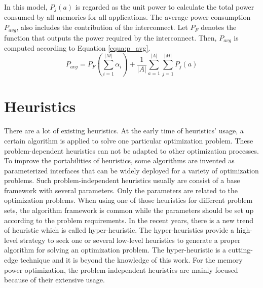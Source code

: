 	In this model, $P_{j} \left( a \right) $ is regarded as the unit power to
	calculate the total power consumed by all memories for all applications.
	The average power consumption $P_{avg}$, also includes the contribution
	of the interconnect. Let $P_{F}$ denotes the function that outputs the
	power required by the interconnect. Then,  $P_{avg}$ is computed
	according to Equation \ref{equa:p_avg}.
	\begin{equation}
	\label{equa:p_avg}
		P_{avg} = P_{F}(\sum_{i=1}^{\lvert M \rvert}\alpha_{i}) +
		\frac{1}{\lvert A \rvert}
		\sum_{a=1}^{\lvert A \rvert} \sum_{j=1}^{\lvert M \rvert}
		P_{j}\left( a \right) 
	\end{equation}						
	
	\section{Heuristics}
	\label{sec:heuristics}
	There are a lot of existing heuristics. At the early time
	of heuristics' usage, a certain algorithm is applied to
	solve one particular optimization problem.
	These problem-dependent heuristics can not be adapted to
	other optimization processes.
	To improve the portabilities of heuristics, some algorithms
	are invented as parameterized interfaces that can be widely
	deployed for a variety of optimization problems.
	Such problem-independent heuristics usually are consist of
	a base framework with several parameters. Only the parameters
	are related to the optimization problems.
	When using one of those heuristics for different problem sets,
	the algorithm framework is common while the parameters should
	be set up according to the problem requirements.
	In the recent years, there is a new trend of heuristic which
	is called hyper-heuristic.
	The hyper-heuristics provide a high-level strategy to seek one
	or several low-level heuristics to generate a proper algorithm
	for solving an optimization problem.
	The hyper-heuristic is a cutting-edge technique and it is
	beyond the knowledge of this work.
	For the memory power optimization, the problem-independent
	heuristics are mainly focused because of their extensive usage.
	
